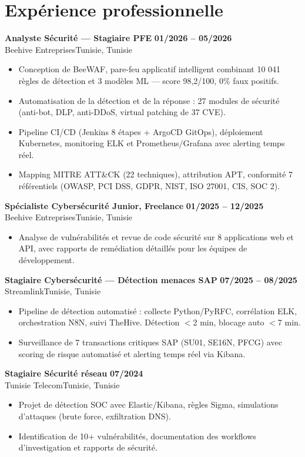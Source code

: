\documentclass[a4paper,9pt]{article}
\newcommand{\cventry}[4]{\textbf{#1} \hfill \textbf{#4}\\[0.2pt]#2{\ifx\relax#3\relax\else, #3\fi}\par\vspace{0.3pt}}
\begin{document}
\section{Expérience professionnelle}
\cventry{Analyste Sécurité --- Stagiaire PFE}{Beehive Entreprises}{Tunisie}{01/2026 -- 05/2026}
\begin{itemize}
  \item Conception de BeeWAF, pare-feu applicatif intelligent combinant 10 041 règles de détection et 3 modèles ML --- score 98,2/100, 0\% faux positifs.
  \item Automatisation de la détection et de la réponse : 27 modules de sécurité (anti-bot, DLP, anti-DDoS, virtual patching de 37 CVE).
  \item Pipeline CI/CD (Jenkins 8 étapes + ArgoCD GitOps), déploiement Kubernetes, monitoring ELK et Prometheus/Grafana avec alerting temps réel.
  \item Mapping MITRE ATT\&CK (22 techniques), attribution APT, conformité 7 référentiels (OWASP, PCI DSS, GDPR, NIST, ISO 27001, CIS, SOC 2).
\end{itemize}
\cventry{Spécialiste Cybersécurité Junior, Freelance}{Beehive Entreprises}{Tunisie}{01/2025 -- 12/2025}
\begin{itemize}
  \item Analyse de vulnérabilités et revue de code sécurité sur 8 applications web et API, avec rapports de remédiation détaillés pour les équipes de développement.
\end{itemize}
\cventry{Stagiaire Cybersécurité --- Détection menaces SAP}{Streamlink}{Tunisie}{07/2025 -- 08/2025}
\begin{itemize}
  \item Pipeline de détection automatisé : collecte Python/PyRFC, corrélation ELK, orchestration N8N, suivi TheHive. Détection $<$2 min, blocage auto $<$7 min.
  \item Surveillance de 7 transactions critiques SAP (SU01, SE16N, PFCG) avec scoring de risque automatisé et alerting temps réel via Kibana.
\end{itemize}
\cventry{Stagiaire Sécurité réseau}{Tunisie Telecom}{Tunisie}{07/2024}
\begin{itemize}
  \item Projet de détection SOC avec Elastic/Kibana, règles Sigma, simulations d'attaques (brute force, exfiltration DNS).
  \item Identification de 10+ vulnérabilités, documentation des workflows d'investigation et rapports de sécurité.
\end{itemize}
\end{document}
